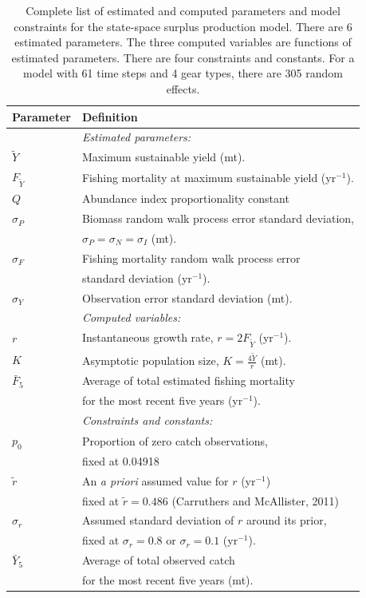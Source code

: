 \documentclass[12pt,letterpaper]{article}
\newcommand\peryr{yr$^{-1}$}
\newcommand\MSY{\widetilde{Y}}
\newcommand\Fmsy{F_{\MSY}}
\begin{document}
\begin{table}
\caption{Complete list of estimated and computed parameters and model
constraints for the state-space surplus production model. 
There are 6 estimated parameters. 
The three computed variables are functions of estimated parameters.
There are four constraints and constants.
For a model with 61 time steps and 4 gear types, there are 305 random effects.
}
\label{tab:allvars1}
\begin{center}
\begin{tabular}{ll}
\hline
Parameter & Definition\\
\hline
\hline
       & {\it Estimated parameters:}\\
$\MSY$ & Maximum sustainable yield (mt).\\
$\Fmsy$& Fishing mortality at maximum sustainable yield (\peryr).\\
$Q$    & Abundance index proportionality constant\\
$\sigma_P$ & Biomass random walk process error standard deviation,\\
           & $\sigma_P=\sigma_N=\sigma_I$ (mt).\\
$\sigma_F$ & Fishing mortality random walk process error\\
           & standard deviation (\peryr).\\
$\sigma_Y$ & Observation error standard deviation (mt).\\
\hline
       & {\it Computed variables:}\\
$r$    & Instantaneous growth rate, $r=2F_{\MSY}$ (\peryr).\\
$K$    & Asymptotic population size, $K=\frac{4\MSY}{r}$ (mt).\\
$\bar{F}_5$ & Average of total estimated fishing mortality\\
            & for the most recent five years (\peryr).\\
\hline
       & {\it Constraints and constants:}\\
$p_0$  & Proportion of zero catch observations,\\
       & fixed at 0.04918\\
$\tilde{r}$ & An {\it a priori} assumed value for $r$ (\peryr)\\
            & fixed at $\tilde{r}=0.486$ (Carruthers and McAllister, 2011)\\
$\sigma_r$  & Assumed standard deviation of $r$ around its prior,\\
            & fixed at $\sigma_r=0.8$ or $\sigma_r=0.1$ (\peryr).\\
$\bar{Y}_5$ & Average of total observed catch\\
            & for the most recent five years (mt).\\
\hline
\end{tabular}
\end{center}
\end{table}
\end{document}
